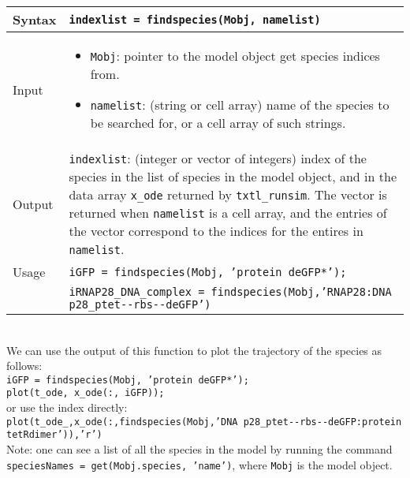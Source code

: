 			\begin{tabular}{p{2cm}|p{13cm}}
			Syntax & \texttt{indexlist = findspecies(Mobj, namelist)}\\ \hline
			Input &  \begin{itemize}
				\item \texttt{Mobj}: pointer to the model object get species indices from.
				\item \texttt{namelist}: (string or cell array) name of the species to be searched for, or a cell array of such strings.
				\end{itemize} \\ \hline
			Output & \texttt{indexlist}: (integer or vector of integers) index of the species in the list of species in the model object, and in the data array \texttt{x\_ode} returned by \texttt{txtl\_runsim}. The vector is returned when \texttt{namelist} is a cell array, and the entries of the vector correspond to the indices for the entires in \texttt{namelist}. \\ \hline
			Usage & \texttt{iGFP = findspecies(Mobj, 'protein deGFP*');}\\
			& \texttt{iRNAP28\_DNA\_complex = findspecies(Mobj,'RNAP28:DNA p28\_ptet-{}-rbs-{}-deGFP')}
			\end{tabular} \\
			
			We can use the output of this function to plot the trajectory of the species as follows: \\
		\texttt{iGFP = findspecies(Mobj, 'protein deGFP*');}\\
  		\texttt{plot(t\_ode, x\_ode(:, iGFP));}	\\
  		  		
		or use the index directly: \\	
		\texttt{plot(t\_ode\_,x\_ode(:,findspecies(Mobj,'DNA p28\_ptet-{}-rbs-{}-deGFP:protein tetRdimer')),'r')} \\
		
		Note: one can see a list of all the species in the model by running the command \texttt{speciesNames = get(Mobj.species, 'name')}, where \texttt{Mobj} is the model object. 
